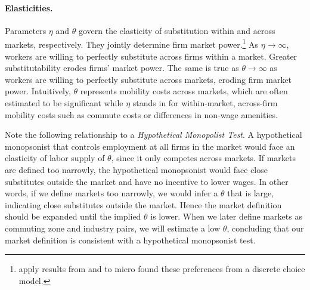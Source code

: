 \documentclass[12pt]{article}
\theoremstyle{prop}
\begin{document}
\paragraph{Elasticities.}
Parameters $\eta$ and $\theta$ govern the elasticity of substitution within and across markets, respectively.
They jointly determine firm market power.\footnote{
     apply results from \citet{AndersonDePalmaThisse1987} and \citet{verboven1996nested} to micro found these preferences from a discrete choice model.}
As $\eta\rightarrow \infty$, workers are willing to perfectly substitute across firms within a market.
Greater substitutability erodes firms' market power.
The same is true as $\theta \rightarrow \infty$ as workers are willing to perfectly substitute across markets, eroding firm market power.
Intuitively, $\theta$ represents mobility costs across markets, which are often estimated to be significant \citep{kennan2011effect} while $\eta$ stands in for within-market, across-firm mobility costs such as commute costs or differences in non-wage amenities. %

Note the following relationship to a \emph{Hypothetical Monopolist Test}.
A hypothetical monopsonist that controls employment at all firms in the market would face an elasticity of labor supply of $\theta$, since it only competes across markets. 
If markets are defined too narrowly, the hypothetical monopsonist would face close substitutes outside the market and have no incentive to lower wages. 
In other words, if we define markets too narrowly, we would infer a $\theta$ that is large, indicating close substitutes outside the market.
Hence the market definition should be expanded until the implied $\theta$ is lower. 
When we later define markets as commuting zone and industry pairs, we will estimate a low $\theta$, concluding that our market definition is consistent with a hypothetical monopsonist test.
\end{document}
